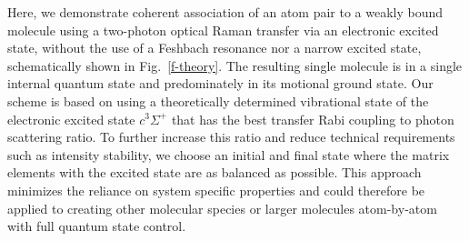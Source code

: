 \documentclass[aps,prl,twocolumn,groupedaddress]{revtex4-1}
\begin{document}
Here, we demonstrate coherent association of an atom pair to a weakly bound molecule using a two-photon optical Raman transfer via an electronic excited state, without the use of a Feshbach resonance nor a narrow excited state, schematically shown in Fig.~\ref{f-theory}. The resulting single molecule is in a single internal quantum state and predominately in its motional ground state.  Our scheme is based on using a theoretically determined vibrational state of the electronic excited state $c^3\Sigma^+$ that has the best transfer Rabi coupling to photon scattering ratio. To further increase this ratio and reduce technical requirements such as intensity stability, we choose an initial and final state where the matrix elements with the excited state are as balanced as possible. This approach minimizes the reliance on system specific properties and could therefore be applied to creating other molecular species or larger molecules atom-by-atom with full quantum state control.





\end{document}
